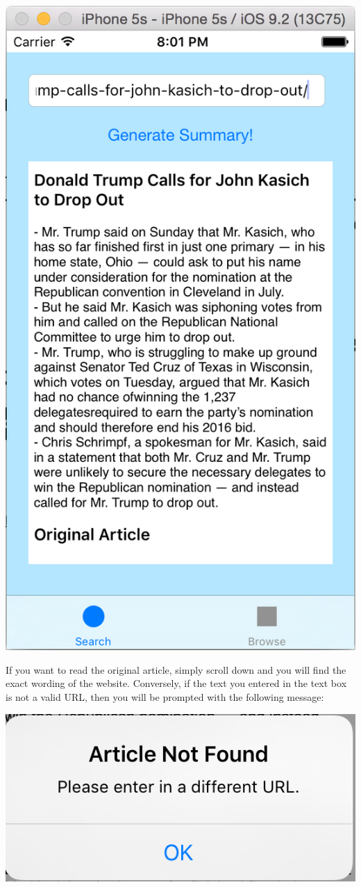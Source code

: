 \documentclass[11pt, margin=1in]{article}
\begin{document}
\begin{center}
\includegraphics[scale=0.7]{4.jpg}
\end{center}
If you want to read the original article, simply scroll down and you will find the exact wording of the website.  Conversely, if the text you entered in the text box is not a valid URL, then you will be prompted with the following message:    
\begin{center}
\includegraphics[scale=0.7]{5.jpg}
\end{center}
\end{document}
